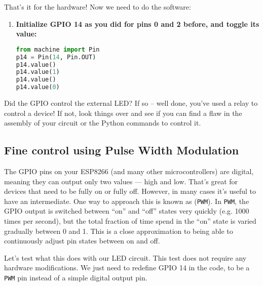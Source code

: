 That’s it for the hardware! Now we need to do the software:

\begin{enumerate}[resume]
	\item \textbf{Initialize GPIO 14 as you did for pins 0 and 2 before, and toggle its value:}
\begin{lstlisting}[language=Python]
from machine import Pin
p14 = Pin(14, Pin.OUT)
p14.value()
p14.value(1)
p14.value()
p14.value(0)
\end{lstlisting}
\end{enumerate}
Did the GPIO control the external LED? If so – well done, you’ve used a relay to control a device! 
If not, look things over and see if you can find a flaw in the assembly of your circuit or the Python commands to control it.

\subsection{Fine control using Pulse Width Modulation}
The GPIO pins on your ESP8266 (and many other microcontrollers) are digital, meaning they can output only two values --- high and low. 
That's great for devices that need to be fully on or fully off. 
However, in many cases it’s useful to have an intermediate. 
One way to approach this is known as  (\texttt{PWM}). 
In \texttt{PWM}, the GPIO output is switched between ``on'' and ``off'' states very quickly (e.g. 1000 times per second), but the total fraction of time spend in the ``on'' state is varied gradually between 0 and 1. 
This is a close approximation to being able to continuously adjust pin states between on and off.

Let’s test what this does with our LED circuit. 
This test does not require any hardware modifications. 
We just need to redefine GPIO 14 in the code, to be a \texttt{PWM} pin instead of a simple digital output pin.

